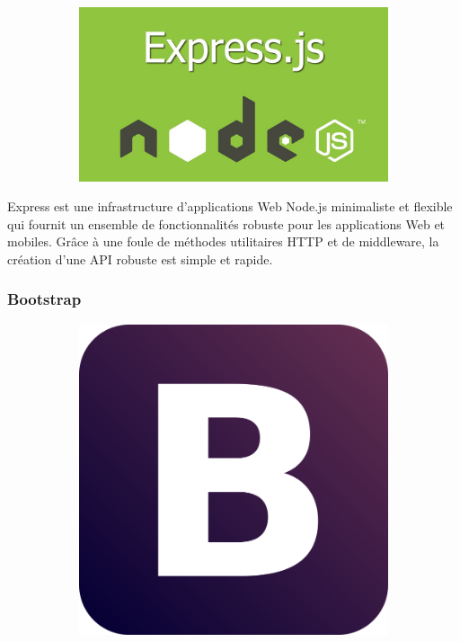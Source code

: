 \documentclass{article}
\begin{document}
\begin{figure}[h!]
	\centering
  	\begin{subfigure}[b]{0.4\linewidth}
    \includegraphics[width=\linewidth]{Express.jpeg}
  	\end{subfigure}
\end{figure}

Express est une infrastructure d'applications Web Node.js minimaliste et flexible qui fournit un ensemble de fonctionnalités robuste pour les applications Web et mobiles.
Grâce à une foule de méthodes utilitaires HTTP et de middleware, la création d'une API robuste est simple et rapide. 


\subsubsection{Bootstrap}

\begin{figure}[h!]
	\centering
  	\begin{subfigure}[b]{0.2\linewidth}
	\includegraphics[width=\linewidth]{boot.png}
  	\end{subfigure}
\end{figure}
\end{document}
